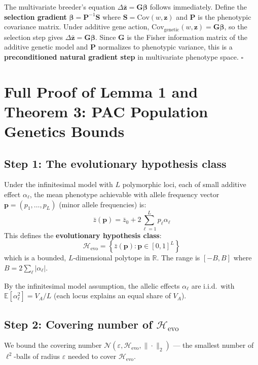 \documentclass[12pt]{article}
\theoremstyle{remark}
\begin{document}
The multivariate breeder's equation $\Delta\bar{\mathbf{z}} = \mathbf{G}\boldsymbol{\beta}$ follows immediately. Define the \textbf{selection gradient} $\boldsymbol{\beta} = \mathbf{P}^{-1}\mathbf{S}$ where $\mathbf{S} = \mathrm{Cov}(w, \mathbf{z})$ and $\mathbf{P}$ is the phenotypic covariance matrix. Under additive gene action, $\mathrm{Cov}_{\text{genetic}}(w, \mathbf{z}) = \mathbf{G}\boldsymbol{\beta}$, so the selection step gives $\Delta\bar{\mathbf{z}} = \mathbf{G}\boldsymbol{\beta}$. Since $\mathbf{G}$ is the Fisher information matrix of the additive genetic model and $\mathbf{P}$ normalizes to phenotypic variance, this is a \textbf{preconditioned natural gradient step} in multivariate phenotype space. $\square$

\section{Full Proof of Lemma 1 and Theorem 3: PAC Population Genetics Bounds}

\subsection{Step 1: The evolutionary hypothesis class}

Under the infinitesimal model with $L$ polymorphic loci, each of small additive effect $\alpha_\ell$, the mean phenotype achievable with allele frequency vector $\mathbf{p} = (p_1, \ldots, p_L)$ (minor allele frequencies) is:
\[
  \bar{z}(\mathbf{p}) = \bar{z}_0 + 2\sum_{\ell=1}^L p_\ell \alpha_\ell
\]
This defines the \textbf{evolutionary hypothesis class}:
\[
  \mathcal{H}_\text{evo} = \left\{\bar{z}(\mathbf{p}) : \mathbf{p} \in [0,1]^L\right\}
\]
which is a bounded, $L$-dimensional polytope in $\mathbb{R}$. The range is $[-B, B]$ where $B = 2\sum_\ell |\alpha_\ell|$.

By the infinitesimal model assumption, the allelic effects $\alpha_\ell$ are i.i.d.\ with $\mathbb{E}[\alpha_\ell^2] = V_A/L$ (each locus explains an equal share of $V_A$).

\subsection{Step 2: Covering number of $\mathcal{H}_\text{evo}$}

We bound the covering number $\mathcal{N}(\varepsilon, \mathcal{H}_\text{evo}, \|\cdot\|_2)$ --- the smallest number of $\ell^2$-balls of radius $\varepsilon$ needed to cover $\mathcal{H}_\text{evo}$.
\end{document}
